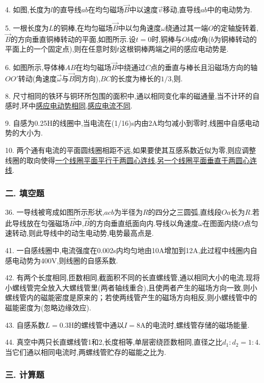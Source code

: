 4. 如图,长度为$l$的直导线$ab$在均匀磁场$\vec B$中以速度$\vec v$移动,直导线$ab$中的电动势为.

5. 一根长度为$L$的铜棒,在均匀磁场$\vec B$中以匀角速度$\omega$绕通过其一端$O$的定轴旋转着,$\vec B$的方向垂直铜棒转动的平面,如图所示.设$t=0$时,铜棒与$Ob$成$\theta$角($b$为铜棒转动的平面上的一个固定点),则在任意时刻$t$这根铜棒两端之间的感应电动势是.

6. 如图所示,导体棒$AB$在均匀磁场$\vec B$中绕通过$C$点的垂直与棒长且沿磁场方向的轴$OO'$转动(角速度$\vec\omega$与$\vec B$同方向),$BC$的长度为棒长的$1/3$,则.

8. 尺寸相同的铁环与铜环所包围的面积中,通以相同变化率的磁通量,当不计环的自感时,环中\ul{感应电动势相同,感应电流不同}.

9. 自感为0.25H的线圈中,当电流在(1/16)s内由2A均匀减小到零时,线圈中自感电动势的大小为.

10. 两个通有电流的平面圆线圈相距不远,如果要使其互感系数近似为零,则应调整线圈的取向使得\ul{一个线圈平面平行于两圆心连线,另一个线圈平面垂直于两圆心连线}.

\subsubsection*{二. 填空题}

36. 一导线被弯成如图所示形状,$acb$为半径为$R$的四分之三圆弧,直线段$Oa$长为$R$.若此导线放在匀强磁场$\vec B$中,$\vec B$的方向垂直纸面向内.导线以角速度$\omega$在图面内绕$O$点匀速转动,则此导线中的动生电动势,电势最高点是.

41. 一自感线圈中,电流强度在0.002s内均匀地由10A增加到12A,此过程中线圈内自感电动势为400V,则线圈的自感系数.

42. 有两个长度相同,匝数相同,截面积不同的长直螺线管,通以相同大小的电流.现将小螺线管完全放入大螺线管里(两者轴线重合),且使两者产生的磁场方向一致,则小螺线管内的磁能密度是原来的；若使两线管产生的磁场方向相反,则小螺线管中的磁能密度为(忽略边缘效应).

43. 自感系数$L=0.3$H的螺线管中通以$I=8$A的电流时,螺线管存储的磁场能量.

44. 真空中两只长直螺线管1和2,长度相等,单层密绕匝数相同,直径之比$d_1:d_2=1:4$.当它们通以相同电流时,两螺线管贮存的磁能之比为.

\subsubsection*{三. 计算题}

